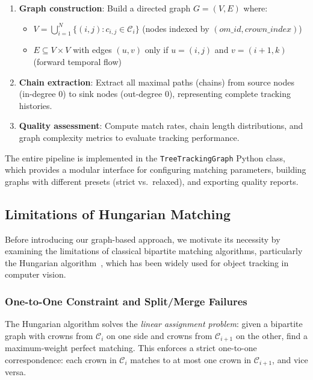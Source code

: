 \begin{enumerate}[leftmargin=*, itemsep=2pt]
    \item \textbf{Graph construction}: Build a directed graph $G = (V, E)$ where:
    \begin{itemize}
        \item $V = \bigcup_{i=1}^N \{(i,j) : c_{i,j} \in \mathcal{C}_i\}$ (nodes indexed by $(om\_id, crown\_index)$)
        \item $E \subseteq V \times V$ with edges $(u, v)$ only if $u = (i,j)$ and $v = (i+1,k)$ (forward temporal flow)
    \end{itemize}
    
    \item \textbf{Chain extraction}: Extract all maximal paths (chains) from source nodes (in-degree 0) to sink nodes (out-degree 0), representing complete tracking histories.
    
    \item \textbf{Quality assessment}: Compute match rates, chain length distributions, and graph complexity metrics to evaluate tracking performance.
\end{enumerate}

The entire pipeline is implemented in the \texttt{TreeTrackingGraph} Python class, which provides a modular interface for configuring matching parameters, building graphs with different presets (strict vs.\ relaxed), and exporting quality reports.

\subsection{Limitations of Hungarian Matching}

Before introducing our graph-based approach, we motivate its necessity by examining the limitations of classical bipartite matching algorithms, particularly the Hungarian algorithm~\cite{kuhn1955hungarian}, which has been widely used for object tracking in computer vision.

\subsubsection{One-to-One Constraint and Split/Merge Failures}

The Hungarian algorithm solves the \emph{linear assignment problem}: given a bipartite graph with crowns from $\mathcal{C}_i$ on one side and crowns from $\mathcal{C}_{i+1}$ on the other, find a maximum-weight perfect matching. This enforces a strict one-to-one correspondence: each crown in $\mathcal{C}_i$ matches to at most one crown in $\mathcal{C}_{i+1}$, and vice versa.

